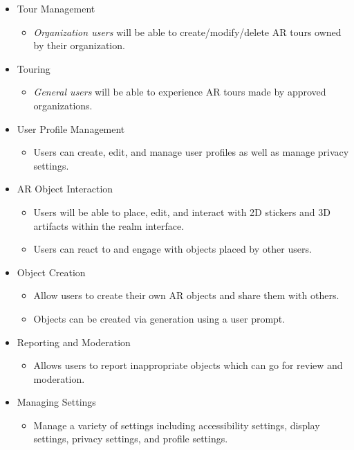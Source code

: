 \documentclass{article}
\begin{document}
\begin{itemize}
    \item Tour Management
          \begin{itemize}
              \item \textit{Organization users} will be able to create/modify/delete AR tours owned by their organization.
          \end{itemize}

    \item Touring
          \begin{itemize}
              \item \textit{General users} will be able to experience AR tours made by approved organizations.
          \end{itemize}

    \item User Profile Management
          \begin{itemize}
              \item Users can create, edit, and manage user profiles as well as manage privacy settings.
          \end{itemize}

    \item AR Object Interaction
          \begin{itemize}
              \item Users will be able to place, edit, and interact with 2D stickers and 3D artifacts within the realm interface.
              \item Users can react to and engage with objects placed by other users.
          \end{itemize}

    \item Object Creation
          \begin{itemize}
              \item Allow users to create their own AR objects and share them with others.
              \item Objects can be created via generation using a user prompt.
          \end{itemize}

    \item Reporting and Moderation
          \begin{itemize}
              \item Allows users to report inappropriate objects which can go for review and moderation.
          \end{itemize}

    \item Managing Settings
          \begin{itemize}
              \item Manage a variety of settings including accessibility settings, display settings, privacy settings, and profile settings.
          \end{itemize}
\end{itemize}
\end{document}
